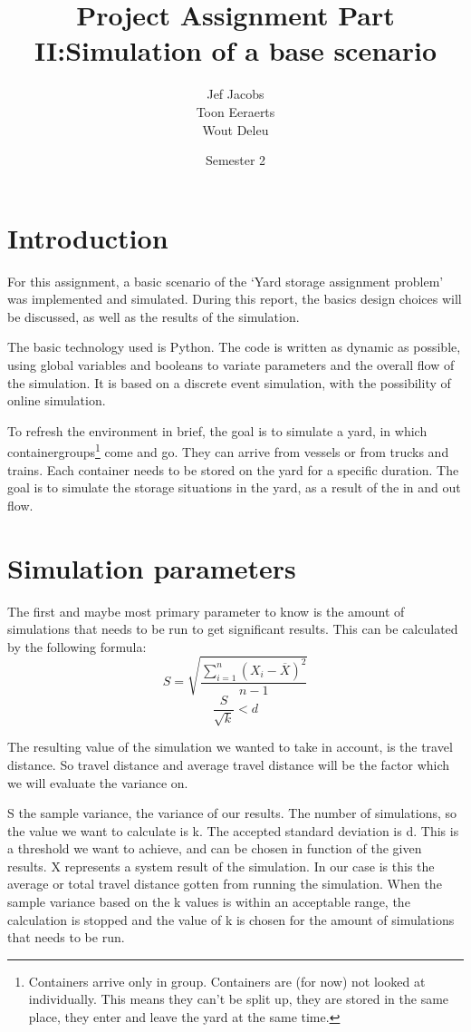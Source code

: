 \documentclass[]{article}
\title{Project Assignment Part II:\@ Simulation of a base scenario }
\author{Jef Jacobs \\ Toon Eeraerts \\ Wout Deleu}
\date{Semester 2}
\begin{document}
\setlength{\parindent}{0pt} \maketitle \tableofcontents \newpage %

\section{Introduction}
For this assignment, a basic scenario of the `Yard storage assignment problem'
was implemented and simulated. During this report, the basics design choices
will be discussed, as well as the results of the simulation.

The basic technology used is Python. The code is written as dynamic as
possible, using global variables and booleans to variate parameters and the
overall flow of the simulation. It is based on a discrete event simulation,
with the possibility of online simulation.

To refresh the environment in brief, the goal is to simulate a yard, in which
containergroups\footnote{Containers arrive only in group. Containers are (for
	now) not looked at individually. This means they can't be split up, they are
	stored in the same place, they enter and leave the yard at the same time.} come
and go. They can arrive from vessels or from trucks and trains. Each container
needs to be stored on the yard for a specific duration. The goal is to simulate
the storage situations in the yard, as a result of the in and out flow.

\section{Simulation parameters}
The first and maybe most primary parameter to know is the amount of simulations
that needs to be run to get significant results. This can be calculated by the
following formula: \[S = \sqrt{\frac{\sum_{i = 1}^{n}(X_i-\overline{X})^2}{n
			-1}}\] \[\frac{S}{\sqrt{k}} < d\]

The resulting value of the simulation we wanted to take in account, is the
travel distance. So travel distance and average travel distance will be the
factor which we will evaluate the variance on.

S the sample variance, the variance of our results. The number of simulations,
so the value we want to calculate is k. The accepted standard deviation is d.
This is a threshold we want to achieve, and can be chosen in function of the
given results. X represents a system result of the simulation. In our case is
this the average or total travel distance gotten from running the simulation.
When the sample variance based on the k values is within an acceptable range,
the calculation is stopped and the value of k is chosen for the amount of
simulations that needs to be run.
\end{document}
